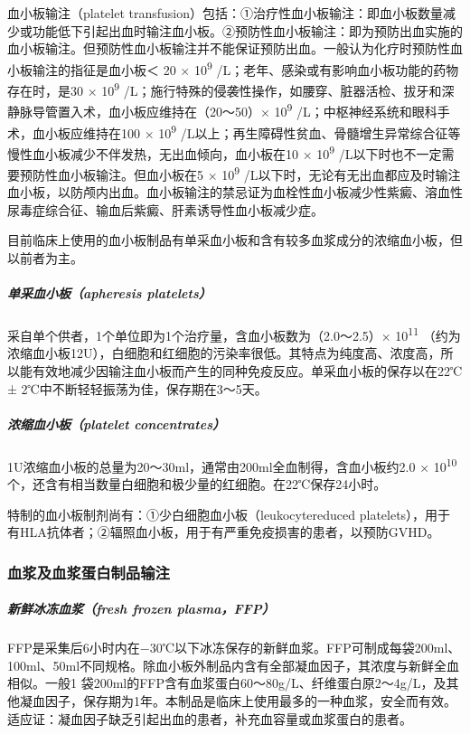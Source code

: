 血小板输注（platelet
transfusion）包括：①治疗性血小板输注：即血小板数量减少或功能低下引起出血时输注血小板。②预防性血小板输注：即为预防出血实施的血小板输注。但预防性血小板输注并不能保证预防出血。一般认为化疗时预防性血小板输注的指征是血小板＜
20 × 10\textsuperscript{9}
/L；老年、感染或有影响血小板功能的药物存在时，是30 ×
10\textsuperscript{9}
/L；施行特殊的侵袭性操作，如腰穿、脏器活检、拔牙和深静脉导管置入术，血小板应维持在（20～50）×
10\textsuperscript{9} /L；中枢神经系统和眼科手术，血小板应维持在100 ×
10\textsuperscript{9}
/L以上；再生障碍性贫血、骨髓增生异常综合征等慢性血小板减少不伴发热，无出血倾向，血小板在10
× 10\textsuperscript{9}
/L以下时也不一定需要预防性血小板输注。但血小板在5 ×
10\textsuperscript{9}
/L以下时，无论有无出血都应及时输注血小板，以防颅内出血。血小板输注的禁忌证为血栓性血小板减少性紫癜、溶血性尿毒症综合征、输血后紫癜、肝素诱导性血小板减少症。

目前临床上使用的血小板制品有单采血小板和含有较多血浆成分的浓缩血小板，但以前者为主。

\subparagraph{单采血小板（apheresis platelets）}

采自单个供者，1个单位即为1个治疗量，含血小板数为（2.0～2.5）×
10\textsuperscript{11}
（约为浓缩血小板12U），白细胞和红细胞的污染率很低。其特点为纯度高、浓度高，所以能有效地减少因输注血小板而产生的同种免疫反应。单采血小板的保存以在22℃±
2℃中不断轻轻振荡为佳，保存期在3～5天。

\subparagraph{浓缩血小板（platelet concentrates）}

1U浓缩血小板的总量为20～30ml，通常由200ml全血制得，含血小板约2.0 ×
10\textsuperscript{10}
个，还含有相当数量白细胞和极少量的红细胞。在22℃保存24小时。

特制的血小板制剂尚有：①少白细胞血小板（leukocytereduced
platelets），用于有HLA抗体者；②辐照血小板，用于有严重免疫损害的患者，以预防GVHD。

\subsubsection{血浆及血浆蛋白制品输注}

\subparagraph{新鲜冰冻血浆（fresh frozen plasma，FFP）}

FFP是采集后6小时内在−30℃以下冰冻保存的新鲜血浆。FFP可制成每袋200ml、100ml、50ml不同规格。除血小板外制品内含有全部凝血因子，其浓度与新鲜全血相似。一般1
袋200ml的FFP含有血浆蛋白60～80g/L、纤维蛋白原2～4g/L，及其他凝血因子，保存期为1年。本制品是临床上使用最多的一种血浆，安全而有效。适应证：凝血因子缺乏引起出血的患者，补充血容量或血浆蛋白的患者。

